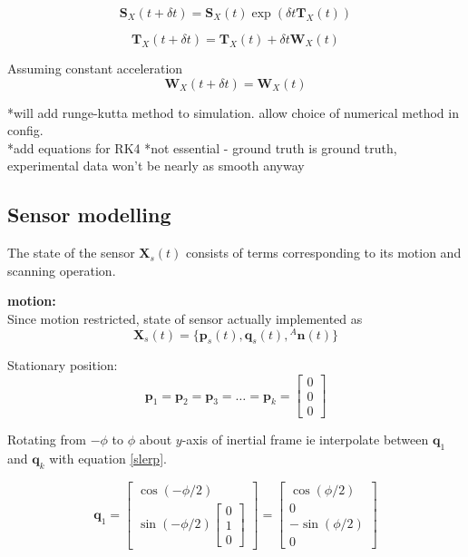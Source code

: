\begin{equation}
	\mathbf{S}_X(t+\delta t) = \mathbf{S}_X(t)\exp({\delta t {\mathbf{T}_X(t)}})
\end{equation}

\begin{equation}
	\mathbf{T}_X(t+\delta t) = \mathbf{T}_X(t) + \delta t \mathbf{W}_X(t)
\end{equation}

Assuming constant acceleration
\begin{equation}
	\mathbf{W}_X(t+\delta t) =\mathbf{W}_X(t)
\end{equation}

*will add runge-kutta method to simulation. allow choice of numerical method in config.\\
*add equations for RK4 
*not essential - ground truth is ground truth, experimental data won't be nearly as smooth anyway

\subsection{Sensor modelling}
The state of the sensor $\mathbf{X}_{s}(t)$ consists of terms corresponding to its motion and scanning operation. 

\textbf{motion:}\\
Since motion restricted, state of sensor actually implemented as 
\begin{equation}
	\mathbf{X}_{s}(t) = \{\mathbf{p}_s(t),\mathbf{q}_s(t),{^{A}\mathbf{n}(t)}\}
\end{equation}

Stationary position:
\begin{equation}
	\mathbf{p}_1 = \mathbf{p}_2 = \mathbf{p}_3 = \dots =  \mathbf{p}_k = 
	\begin{bmatrix}
		0 \\ 0 \\ 0
   	\end{bmatrix}
\end{equation}

													
Rotating from $-\phi$ to $\phi$ about $y$-axis of inertial frame ie interpolate between $\mathbf{q}_1$ and $\mathbf{q}_k$ with equation \ref{slerp}.
	
\begin{equation}
	\mathbf{q}_1 = \begin{bmatrix}
				 	\cos(-\phi/2) \\
				 	\sin(-\phi/2){\begin{bmatrix}
								 	0 \\ 1 \\ 0
							   	 \end{bmatrix}}
				 \end{bmatrix}
				 = \begin{bmatrix}
		 		   		\cos(\phi/2) \\ 0 \\ -\sin(\phi/2) \\ 0
				   \end{bmatrix}
\end{equation}

